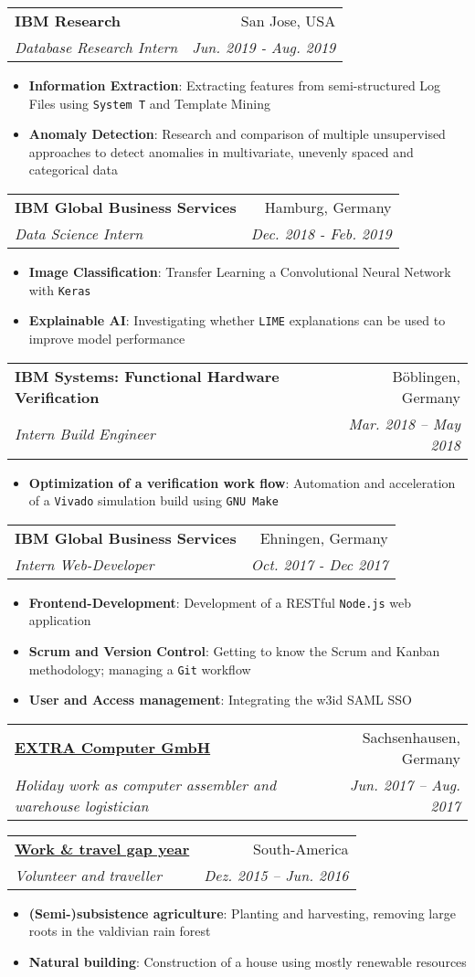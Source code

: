 \documentclass[letterpaper,11pt]{article}
\makeatletter
\newcommand{\resumeItem}[2]{
  \item\small{
    \textbf{#1}{: #2 \vspace{-2pt}}
  }
}
\newcommand{\resumeSubheading}[4]{
  \vspace{-1pt}\item
    \begin{tabular*}{0.97\textwidth}[t]{l@{\extracolsep{\fill}}r}
      \textbf{#1} & #2 \\
      \textit{\small#3} & \textit{\small #4} \\
    \end{tabular*}\vspace{-5pt}
}
\newcommand{\resumeItemListStart}{\begin{itemize}}
\newcommand{\resumeItemListEnd}{\end{itemize}\vspace{-5pt}}
\makeatother
\begin{document}
  	\resumeSubheading
      {IBM Research}{San Jose, USA}
      {Database Research Intern}{Jun. 2019 - Aug. 2019}
      \resumeItemListStart
        \resumeItem{Information Extraction}
          {Extracting features from semi-structured Log Files using \texttt{System T} and Template Mining}
        \resumeItem{Anomaly Detection}
          {Research and comparison of multiple unsupervised approaches to detect anomalies in multivariate, unevenly spaced and categorical data}
      \resumeItemListEnd

    \resumeSubheading
      {IBM Global Business Services}{Hamburg, Germany}
      {Data Science Intern}{Dec. 2018 - Feb. 2019}
      \resumeItemListStart
        \resumeItem{Image Classification}
          {Transfer Learning a Convolutional Neural Network with \texttt{Keras}}
		\resumeItem{Explainable AI}
          {Investigating whether \texttt{LIME} explanations can be used to improve model performance}
      \resumeItemListEnd

    \resumeSubheading
      {IBM Systems: Functional Hardware Verification}{Böblingen, Germany}
      {Intern Build Engineer}{Mar. 2018 -- May 2018}
      \resumeItemListStart
        \resumeItem{Optimization of a verification work flow}
          {Automation and acceleration of a \texttt{Vivado} simulation build using \texttt{GNU Make}}
      \resumeItemListEnd

    \resumeSubheading
    	 {IBM Global Business Services}{Ehningen, Germany}
      {Intern Web-Developer}{Oct. 2017 - Dec 2017}
      \resumeItemListStart
        \resumeItem{Frontend-Development}
          {Development of a RESTful \texttt{Node.js} web application}
        \resumeItem{Scrum and Version Control}
          {Getting to know the Scrum and Kanban methodology; managing a \texttt{Git} workflow}
        \resumeItem{User and Access management}
        {Integrating the w3id SAML SSO}
      \resumeItemListEnd
      
     \resumeSubheading
		{\href{https://www.exone.de}{EXTRA Computer GmbH}}{Sachsenhausen, Germany}
		{Holiday work as computer assembler and warehouse logistician}{Jun. 2017 -- Aug. 2017}     
      
	\resumeSubheading
		{\href{http://mariushegele.com/album-del-viajero/}{Work \& travel gap year}}{South-America}
		{Volunteer and traveller}{Dez. 2015 -- Jun. 2016}
	\resumeItemListStart
        \resumeItem{(Semi-)subsistence agriculture}
          {Planting and harvesting, removing large roots in the valdivian rain forest}
        \resumeItem{Natural building}
          {Construction of a house using mostly renewable resources}
      \resumeItemListEnd
      
\end{document}
